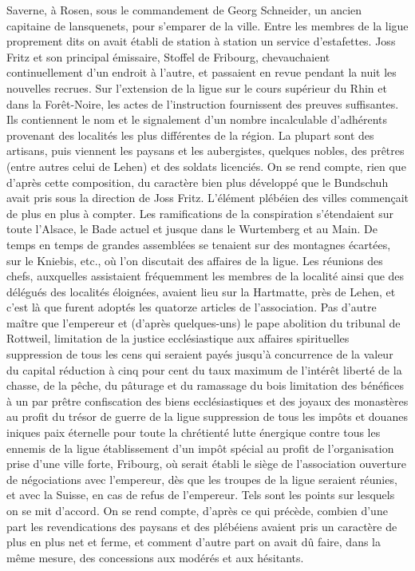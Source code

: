 \documentclass[french,twoside]{book} %
\begin{document}
Saverne, à Rosen, sous le commandement de Georg Schneider, un ancien capitaine de lansquenets, pour s’emparer de la ville. Entre les membres de la ligue proprement dits on avait établi de station à station un service d’estafettes. Joss Fritz et son principal émissaire, Stoffel de Fribourg, chevauchaient continuellement d’un endroit à l’autre, et passaient en revue pendant la nuit les nouvelles recrues. Sur l’extension de la ligue sur le cours supérieur du Rhin et dans la Forêt-Noire, les actes de l’instruction fournissent des preuves suffisantes. Ils contiennent le nom et le signalement d’un nombre incalculable d’adhérents provenant des localités les plus différentes de la région. La plupart sont des artisans, puis viennent les paysans et les aubergistes, quelques nobles, des prêtres (entre autres celui de Lehen) et des soldats licenciés. On se rend compte, rien que d’après cette composition, du caractère bien plus développé que le Bundschuh avait pris sous la direction de Joss Fritz. L’élément plébéien des villes commençait de plus en plus à compter. Les ramifications de la conspiration s’étendaient sur toute l’Alsace, le Bade actuel et jusque dans le Wurtemberg et au Main. De temps en temps de grandes assemblées se tenaient sur des montagnes écartées, sur le Kniebis, etc., où l’on discutait des affaires de la ligue. Les réunions des chefs, auxquelles assistaient fréquemment les membres de la localité ainsi que des délégués des localités éloignées, avaient lieu sur la Hartmatte, près de Lehen, et c’est là que furent adoptés les quatorze articles de l’association. Pas d’autre maître que l’empereur et (d’après quelques-uns) le pape abolition du tribunal de Rottweil, limitation de la justice ecclésiastique aux affaires spirituelles suppression de tous les cens qui seraient payés jusqu’à concurrence de la valeur du capital réduction à cinq pour cent du taux maximum de l’intérêt liberté de la chasse, de la pêche, du pâturage et du ramassage du bois limitation des bénéfices à un par prêtre confiscation des biens ecclésiastiques et des joyaux des monastères au profit du trésor de guerre de la ligue suppression de tous les impôts et douanes iniques paix éternelle pour toute la chrétienté lutte énergique contre tous les ennemis de la ligue établissement d’un impôt spécial au profit de l’organisation prise d’une ville forte, Fribourg, où serait établi le siège de l’association ouverture de négociations avec l’empereur, dès que les troupes de la ligue seraient réunies, et avec la Suisse, en cas de refus de l’empereur. Tels sont les points sur lesquels on se mit d’accord. On se rend compte, d’après ce qui précède, combien d’une part les revendications des paysans et des plébéiens avaient pris un caractère de plus en plus net et ferme, et comment d’autre part on avait dû faire, dans la même mesure, des concessions aux modérés et aux hésitants.\par
\end{document}
